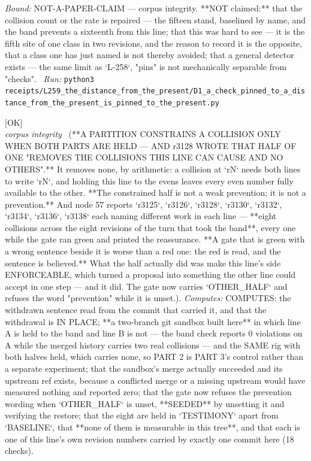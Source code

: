 \begin{description}
 \emph{Bound:} NOT-A-PAPER-CLAIM --- corpus integrity. **NOT claimed:** that the collision count or the rate is repaired --- the fifteen stand, baselined by name, and the band prevents a sixteenth from this line; that this was hard to see --- it is the fifth site of one class in two revisions, and the reason to record it is the opposite, that a class one has just named is not thereby avoided; that a general detector exists --- the same limit as `L-258`, "pins" is not mechanically separable from "checks".
\ \emph{Run:} \texttt{python3 receipts/L259\_the\_distance\_from\_the\_present/D1\_a\_check\_pinned\_to\_a\_distance\_from\_the\_present\_is\_pinned\_to\_the\_present.py}
\item[\label{rcpt:H1_half_a_partition_removes_nothing_and_the_gate_said_otherwise_while_eight_landed}\texttt{H1\_half\_a\_partition\_removes\_nothing\_and\_the\_gate\_said\_otherwise\_while\_eight\_landed}]\hfill\textsf{[OK]}\\
\textit{corpus integrity} \ (**A PARTITION CONSTRAINS A COLLISION ONLY WHEN BOTH PARTS ARE HELD --- AND r3128 WROTE THAT HALF OF ONE "REMOVES THE COLLISIONS THIS LINE CAN CAUSE AND NO OTHERS".** It removes none, by arithmetic: a collision at `rN` needs both lines to write `rN`, and holding this line to the evens leaves every even number fully available to the other. **The constrained half is not a weak prevention; it is not a prevention.** And node 57 reports `r3125`, `r3126`, `r3128`, `r3130`, `r3132`, `r3134`, `r3136`, `r3138` each naming different work in each line --- **eight collisions across the eight revisions of the turn that took the band**, every one while the gate ran green and printed the reassurance. **A gate that is green with a wrong sentence beside it is worse than a red one: the red is read, and the sentence is believed.** What the half actually did was make this line's side ENFORCEABLE, which turned a proposal into something the other line could accept in one step --- and it did. The gate now carries `OTHER\_HALF` and refuses the word "prevention" while it is unset.). 
\emph{Computes:} COMPUTES: the withdrawn sentence read from the commit that carried it, and that the withdrawal is IN PLACE; **a two-branch git sandbox built here** in which line A is held to the band and line B is not --- the band check reports 0 violations on A while the merged history carries two real collisions --- and the SAME rig with both halves held, which carries none, so PART 2 is PART 3's control rather than a separate experiment; that the sandbox's merge actually succeeded and its upstream ref exists, because a conflicted merge or a missing upstream would have measured nothing and reported zero; that the gate now refuses the prevention wording when `OTHER\_HALF` is unset, **SEEDED** by unsetting it and verifying the restore; that the eight are held in `TESTIMONY` apart from `BASELINE`, that **none of them is measurable in this tree**, and that each is one of this line's own revision numbers carried by exactly one commit here (18 checks).

\end{description}
